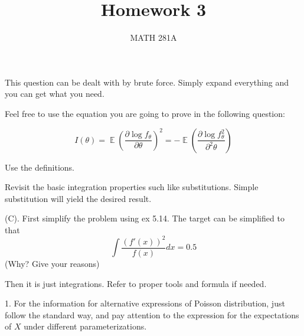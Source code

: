 \documentclass[12pt]{article}
\newenvironment{exercise}[2][Exercise]{\begin{trivlist}
\item[\hskip \labelsep {\bfseries #1}\hskip \labelsep {\bfseries #2.}]}{\end{trivlist}}
\newcommand{\E}{\operatorname{\mathbb{E}}}
\begin{document}
\title{Homework 3}%
\author{MATH 281A} %
\maketitle
\begin{exercise}{2.15}
\end{exercise}

This question can be dealt with by brute force. Simply expand everything and you can get what you need.

\begin{exercise}{5.4}
\end{exercise}

Feel free to use the equation you are going to prove in the following question:

$$
I(\theta) = \E (\frac{\partial \log f_\theta}{\partial \theta})^2 = - \E (\frac{\partial \log f_\theta^2}{\partial^2 \theta})
$$

\begin{exercise}{5.5}
\end{exercise}

Use the definitions.

\begin{exercise}{5.14}
\end{exercise}

Revisit the basic integration properties such like substitutions. Simple substitution will yield the desired result.

\begin{exercise}{5.16}
\end{exercise}

(C). First simplify the problem using ex 5.14. The target can be simplified to that 
$$
\int \frac{(f'(x))^2}{f(x)} dx = 0.5
$$
(Why? Give your reasons)

Then it is just integrations. Refer to proper tools and formula if needed.

\begin{exercise}{Extra}
\end{exercise}

1. For the information for alternative expressions of Poisson distribution, just follow the standard way, and pay attention to the expression for the expectations of $X$ under different parameterizations. 
\end{document}
